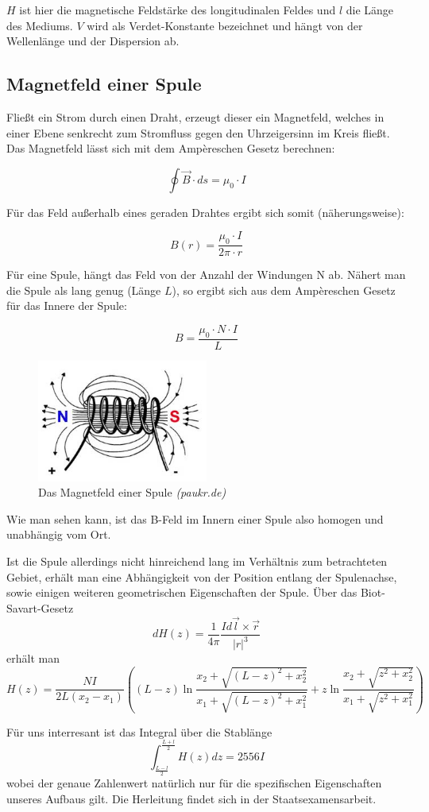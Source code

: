 $H$ ist hier die magnetische Feldstärke des longitudinalen Feldes und $l$ die Länge des Mediums. $V$ wird als Verdet-Konstante bezeichnet und hängt von der Wellenlänge und der Dispersion ab.

\subsection{Magnetfeld einer Spule}

Fließt ein Strom durch einen Draht, erzeugt dieser ein Magnetfeld, welches in einer Ebene senkrecht zum Stromfluss gegen den Uhrzeigersinn im Kreis fließt. Das Magnetfeld lässt sich mit dem Ampèreschen Gesetz berechnen:

\begin{equation} \oint \vec B \cdot ds = \mu_0\cdot I \end{equation}

Für das Feld außerhalb eines geraden Drahtes ergibt sich somit (näherungsweise):

$$B(r) = \frac{\mu_0\cdot I}{2\pi\cdot r} $$

Für eine Spule, hängt das Feld von der Anzahl der Windungen N ab. Nähert man die Spule als lang genug (Länge $L$), so ergibt sich aus dem Ampèreschen Gesetz für das Innere der Spule:

\begin{equation} B = \frac{\mu_0\cdot N\cdot I}{L} \end{equation}


\begin{figure}[H]
	\centering \includegraphics[width = 0.5\textwidth]{Bilder/Spule.jpg}
	\caption{Das Magnetfeld einer Spule \emph{(paukr.de)}}
\end{figure}

Wie man sehen kann, ist das B-Feld im Innern einer Spule also homogen und unabhängig vom Ort.

Ist die Spule allerdings nicht hinreichend lang im Verhältnis zum betrachteten Gebiet, erhält man eine Abhängigkeit von der Position entlang der Spulenachse, sowie einigen weiteren geometrischen Eigenschaften der Spule. Über das Biot-Savart-Gesetz
$$  dH\left( z \right) = \frac{1}{4 \pi} \frac{I d\vec{l} \times \vec{r}}{\left|r\right|^3} $$
erhält man
$$ H \left( z \right) = \frac{N I}{2 L \left( x_2 - x_1 \right)} \left( \left( L - z \right) \ln \frac{x_2 + \sqrt{\left( L-z \right)^2 + x_2^2}}{x_1 + \sqrt{\left( L - z \right)^2 + x_1^2}} + z \ln \frac{x_2 + \sqrt{z^2 + x_2^2}}{x_1 + \sqrt{z^2 + x_1^2}}  \right) $$

Für uns interresant ist das Integral über die Stablänge
$$ \int_{\frac{L-l}{2}}^{\frac{L+l}{2}} H\left( z \right) dz = 2556 I $$
wobei der genaue Zahlenwert natürlich nur für die spezifischen Eigenschaften unseres Aufbaus gilt. Die Herleitung findet sich in der Staatsexamensarbeit.


\clearpage
